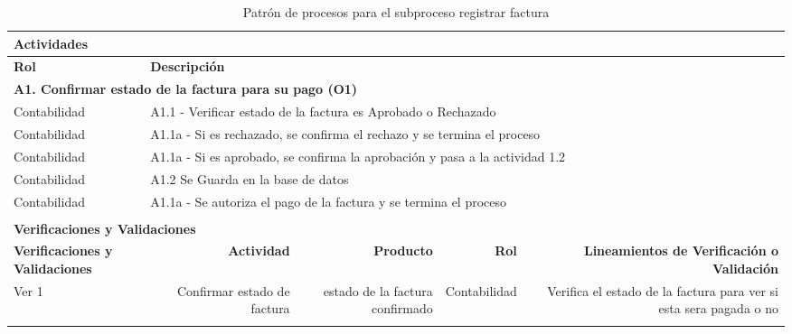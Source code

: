 \begin{longtable}{|llrrrrrr|}
	
	\multicolumn{8}{|l|}{\textbf{Actividades}} \\ \hline
    \textbf{Rol} & \multicolumn{7}{|l|}{\textbf{Descripción}} \\ \hline 
    \multicolumn{8}{|l|}{\textbf{A1. Confirmar estado de la factura para su pago (O1) }} \\ \hline
    Contabilidad & \multicolumn{7}{|m{12cm}|}{A1.1 - Verificar estado de la factura es Aprobado o Rechazado } \\ \hline
    Contabilidad & \multicolumn{7}{|m{12cm}|}{A1.1a - Si es rechazado, se confirma el rechazo y se termina el proceso} \\ \hline
    Contabilidad & \multicolumn{7}{|m{12cm}|}{A1.1a - Si es aprobado, se confirma la aprobación y pasa a la actividad 1.2} \\ \hline
    Contabilidad & \multicolumn{7}{|m{12cm}|}{A1.2 Se Guarda en la base de datos} \\ \hline
    Contabilidad & \multicolumn{7}{|m{12cm}|}{A1.1a - Se autoriza el pago de la factura y se termina el proceso} \\ \hline    
     & & & & & & & \\ \hline
	\multicolumn{8}{|l|}{\textbf{Verificaciones y Validaciones}} \\ \hline
	\multicolumn{2}{|m{3cm}|}{\textbf{Verificaciones y Validaciones}} & \multicolumn{1}{m{2cm}|}{\textbf{Actividad}} & \multicolumn{1}{m{2,2cm}|}{\textbf{Producto}} & \multicolumn{2}{m{1.5cm}|}{\textbf{Rol}} &\multicolumn{2}{m{4cm}|}{\textbf{Lineamientos de Verificación o Validación}} \\ \hline
	
	\multicolumn{2}{|m{3cm}|}{Ver 1} & \multicolumn{1}{m{2cm}|}{Confirmar estado de factura} & \multicolumn{1}{m{2,2cm}|}{estado de la factura confirmado} & \multicolumn{2}{m{0.51cm}|}{Contabilidad} &\multicolumn{2}{m{4cm}|}{Verifica el estado de la factura para ver si esta sera pagada o no} \\ \hline
	\caption{Patrón de procesos para el subproceso registrar factura}

\end{longtable}